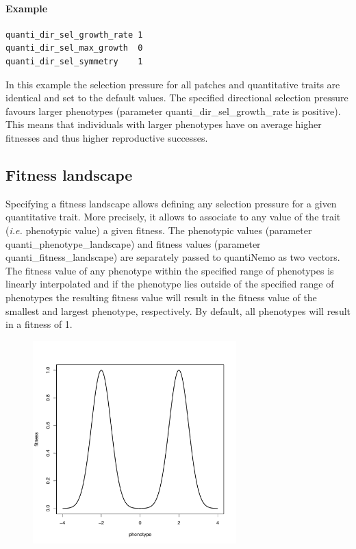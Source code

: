 \documentclass[letterpaper,12pt,oneside]{book}
\begin{document}
\paragraph{Example}\hspace*{\fill}
\begin{lstlisting}[frame=single]
quanti_dir_sel_growth_rate 1    
quanti_dir_sel_max_growth  0    
quanti_dir_sel_symmetry    1    
\end{lstlisting}
In this example the selection pressure for all patches and quantitative traits are identical and set to the default values. The specified directional selection pressure favours larger phenotypes (parameter \textsf{quanti\_dir\_sel\_growth\_rate} is positive). This means that individuals with larger phenotypes have on average higher fitnesses and thus higher reproductive successes.

\subsection{Fitness landscape}
Specifying a fitness landscape allows defining any selection pressure for a given quantitative trait. More precisely, it allows to associate to any value of the trait (\textit{i.e.} phenotypic value) a given fitness. The phenotypic values (parameter \textsf{quanti\_phenotype\_landscape}) and fitness values (parameter \textsf{quanti\_fitness\_landscape}) are separately passed to quantiNemo as two vectors. The fitness value of any phenotype within the specified range of phenotypes is linearly interpolated and if the phenotype lies outside of the specified range of phenotypes the resulting fitness value will result in the fitness value of the smallest and largest phenotype, respectively. By default, all phenotypes will result in a fitness of 1. 

\begin{figure}[h]
    \centering
        \includegraphics[width=0.70\textwidth]{fitness-landscape-selection.pdf}
    \label{fig:fitness-landscape-selection}
\end{figure}
\end{document}
